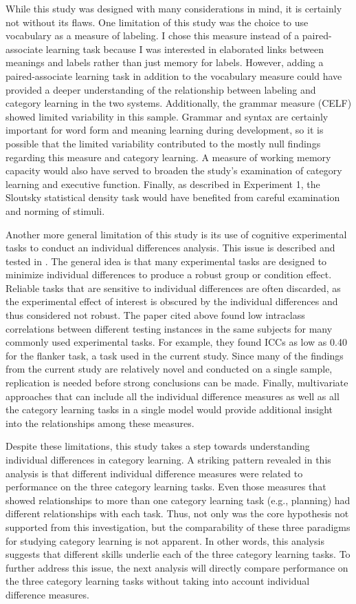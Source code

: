 \documentclass[../dissertation.tex]{subfiles}
\begin{document}
	While this study was designed with many considerations in mind, it is certainly not without its flaws. One limitation of this study was the choice to use vocabulary as a measure of labeling. I chose this measure instead of a paired-associate learning task because I was interested in elaborated links between meanings and labels rather than just memory for labels. However, adding a paired-associate learning task in addition to the vocabulary measure could have provided a deeper understanding of the relationship between labeling and category learning in the two systems. Additionally, the grammar measure (CELF) showed limited variability in this sample. Grammar and syntax are certainly important for word form and meaning learning during development, so it is possible that the limited variability contributed to the mostly null findings regarding this measure and category learning. A measure of working memory capacity would also have served to broaden the study's examination of category learning and executive function. Finally, as described in Experiment 1, the Sloutsky statistical density task would have benefited from careful examination and norming of stimuli. \par
	Another more general limitation of this study is its use of cognitive experimental tasks to conduct an individual differences analysis. This issue is described and tested in \citet{Hedge2018}. The general idea is that many experimental tasks are designed to minimize individual differences to produce a robust group or condition effect. Reliable tasks that are sensitive to individual differences are often discarded, as the experimental effect of interest is obscured by the individual differences and thus considered not robust. The paper cited above found low intraclass correlations between different testing instances in the same subjects for many commonly used experimental tasks. For example, they found ICCs as low as 0.40 for the flanker task, a task used in the current study. Since many of the findings from the current study are relatively novel and conducted on a single sample, replication is needed before strong conclusions can be made. Finally, multivariate approaches that can include all the individual difference measures as well as all the category learning tasks in a single model would provide additional insight into the relationships among these measures. \par
	Despite these limitations, this study takes a step towards understanding individual differences in category learning. A striking pattern revealed in this analysis is that different individual difference measures were related to performance on the three category learning tasks. Even those measures that showed relationships to more than one category learning task (e.g., planning) had different relationships with each task. Thus, not only was the core hypothesis not supported from this investigation, but the comparability of these three paradigms for studying category learning is not apparent. In other words, this analysis suggests that different skills underlie each of the three category learning tasks. To further address this issue, the next analysis will directly compare performance on the three category learning tasks without taking into account individual difference measures.
	 
\end{document}
